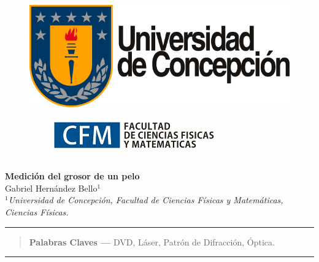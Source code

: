 \documentclass[10pt,a4paper]{article}
\author{Gabriel Hernandez Bello}
\begin{document}
	
	\begin{figure}[H]
		\raggedright
		\includegraphics[scale=0.2]{../Altura-Campanil/IMG/logo_udec.png} \hfill \includegraphics[scale=0.5]{../Altura-Campanil/IMG/cfm_logo.png}
	\end{figure}

	\vspace{6mm}
	\begin{center}
		{\Large \textbf{Medición del grosor de un pelo}}\\
		\vspace{2mm}
		{\large Gabriel Hernández Bello$^{1}$}\\
		\vspace{6.5mm}
		$^1$\textit{Universidad de Concepción, Facultad de Ciencias Físicas y Matemáticas, Ciencias Físicas. }\\
	\end{center}

	\begin{center}
		\textcolor{pinegreen}{\rule{150mm}{0.8mm}}
	\end{center}

	\begin{abstract}

		\textbf{Palabras Claves ---}  DVD, Láser, Patrón de Difracción, Óptica.
	\end{abstract}
	
	\begin{center}
		\textcolor{pinegreen}{\rule{150mm}{0.8mm}}
	\end{center}
	
\end{document}
